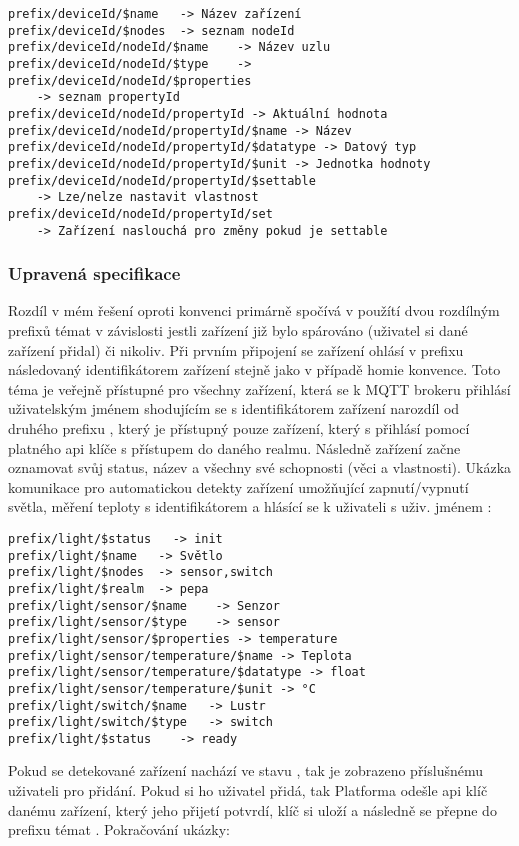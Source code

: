 \begin{verbatim}
prefix/deviceId/$name   -> Název zařízení
prefix/deviceId/$nodes  -> seznam nodeId
prefix/deviceId/nodeId/$name    -> Název uzlu
prefix/deviceId/nodeId/$type    ->
prefix/deviceId/nodeId/$properties
    -> seznam propertyId
prefix/deviceId/nodeId/propertyId -> Aktuální hodnota
prefix/deviceId/nodeId/propertyId/$name -> Název
prefix/deviceId/nodeId/propertyId/$datatype -> Datový typ
prefix/deviceId/nodeId/propertyId/$unit -> Jednotka hodnoty
prefix/deviceId/nodeId/propertyId/$settable
    -> Lze/nelze nastavit vlastnost
prefix/deviceId/nodeId/propertyId/set
    -> Zařízení naslouchá pro změny pokud je settable
\end{verbatim}

\subsubsection{Upravená specifikace}
Rozdíl v mém řešení oproti  konvenci primárně spočívá v použítí dvou rozdílným prefixů témat v závislosti jestli zařízení již bylo spárováno (uživatel si dané zařízení přidal) či nikoliv. Při prvním připojení se zařízení ohlásí v prefixu  následovaný identifikátorem zařízení stejně jako v případě homie konvence. Toto téma je veřejně přístupné pro všechny zařízení, která se k MQTT brokeru přihlásí uživatelským jménem shodujícím se s identifikátorem zařízení narozdíl od druhého prefixu , který je přístupný pouze zařízení, který s přihlásí pomocí platného api klíče s přístupem do daného realmu. Následně zařízení začne oznamovat svůj status, název a všechny své schopnosti (věci a vlastnosti). Ukázka komunikace pro automatickou detekty zařízení umožňující zapnutí/vypnutí světla, měření teploty s identifikátorem  a hlásící se k uživateli s uživ. jménem :

\begin{verbatim}
prefix/light/$status   -> init
prefix/light/$name   -> Světlo
prefix/light/$nodes  -> sensor,switch
prefix/light/$realm  -> pepa
prefix/light/sensor/$name    -> Senzor
prefix/light/sensor/$type    -> sensor
prefix/light/sensor/$properties -> temperature
prefix/light/sensor/temperature/$name -> Teplota
prefix/light/sensor/temperature/$datatype -> float
prefix/light/sensor/temperature/$unit -> °C
prefix/light/switch/$name   -> Lustr
prefix/light/switch/$type   -> switch
prefix/light/$status    -> ready
\end{verbatim}

Pokud se detekované zařízení nachází ve stavu , tak je zobrazeno příslušnému uživateli pro přidání. Pokud si ho uživatel přidá, tak Platforma odešle api klíč danému zařízení, který jeho přijetí potvrdí, klíč si uloží a následně se přepne do prefixu témat . Pokračování ukázky:

